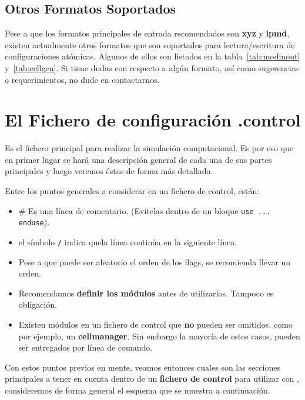 \subsection{Otros Formatos Soportados}

Pese a que los formatos principales de entrada recomendados son \textbf{xyz} y \textbf{lpmd}, existen actualmente otros formatos que son soportados para lectura/escritura de configuraciones at\'omicas. Algunos de ellos son listados en la tabla~\ref{tab:modinout} y~\ref{tab:cellgen}. Si tiene dudas con respecto a alg\'un formato, as\'i como sugerencias o requerimientos, no dude en contactarnos.

\section{El Fichero de configuraci\'on .control}

Es el fichero principal para realizar la simulaci\'on computacional. Es por eso que en primer lugar se har\'a una descripci\'on general de cada una de sus partes principales y luego veremos \'estas de forma m\'as detallada.

Entre los puntos generales a considerar en un fichero de control, est\'an:

\begin{itemize}
 \item \# Es una l\'inea de comentario. (Evitelas dentro de un bloque \texttt{use ... enduse}).
 \item el s\'imbolo \verb|/| indica quela l\'inea contin\'ua en la siguiente l\'inea.
 \item Pese a que puede ser aleatorio el orden de los flags, se recomienda llevar un orden.
 \item Recomendamos \textbf{definir los m\'odulos} antes de utilizarlos. Tampoco es obligaci\'on.
 \item Existen m\'odulos en un fichero de control que \textbf{no} pueden ser omitidos, como por ejemplo, un \textbf{cellmanager}. Sin embargo la mayor\'ia de estos casos, pueden ser entregados por l\'inea de comando.
\end{itemize}

Con estos puntos previos en mente, veamos entonces cuales son las secciones principales a tener en cuenta dentro de un \textbf{fichero de control} para utilizar con {\lpmd}, consideremos de forma general el esquema que se muestra a continuaci\'on.

